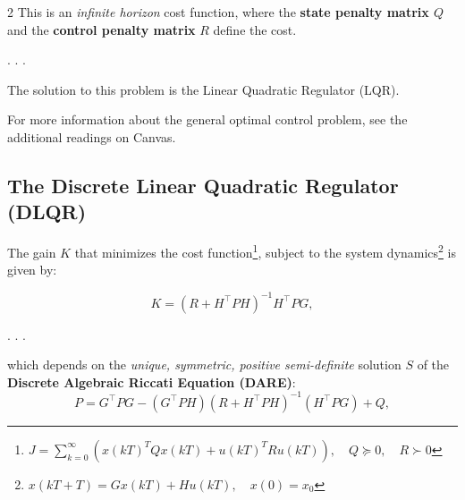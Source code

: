 \documentclass[
  letterpaper,
  DIV=11,
  numbers=noendperiod,
  oneside]{scrartcl}
\begin{document}
2 This is an \emph{infinite horizon} cost function, where the
\textbf{state penalty matrix \(Q\)} and the \textbf{control penalty
matrix} \(R\) define the cost.


. . .

The solution to this problem is the {Linear} {Quadratic} {Regulator}
{(LQR).}

\begin{tcolorbox}[enhanced jigsaw, rightrule=.15mm, coltitle=black, titlerule=0mm, breakable, title=\textcolor{quarto-callout-tip-color}{\faLightbulb}\hspace{0.5em}{Additional Reading}, bottomrule=.15mm, colback=white, toprule=.15mm, opacityback=0, opacitybacktitle=0.6, leftrule=.75mm, left=2mm, colbacktitle=quarto-callout-tip-color!10!white, bottomtitle=1mm, toptitle=1mm, arc=.35mm, colframe=quarto-callout-tip-color-frame]

For more information about the general optimal control problem, see the
additional readings on Canvas.

\end{tcolorbox}

\subsection{The Discrete Linear Quadratic Regulator
(DLQR)}\label{the-discrete-linear-quadratic-regulator-dlqr}

The gain \(K\) that minimizes the cost function\footnote{\(J = \sum_{k=0}^{\infty} \left( x(kT)^T Q x(kT) + u(kT)^T R u(kT) \right), \quad Q\succeq 0, \quad R\succ 0\)},
subject to the system dynamics\footnote{\(x(kT+T) = Gx(kT) + Hu(kT), \quad x(0) = x_0\)}
is given by:

\[
K = (R + H^\intercal P H)^{-1} H^\intercal P G,
\]

. . .

which depends on the \emph{unique, symmetric, positive semi-definite}
solution \(S\) of the \textbf{Discrete Algebraic Riccati Equation
(DARE)}: \[
P = G^\intercal PG - (G^\intercal PH)(R+H^\intercal PH)^{-1}(H^\intercal PG) + Q,
\]
\end{document}
